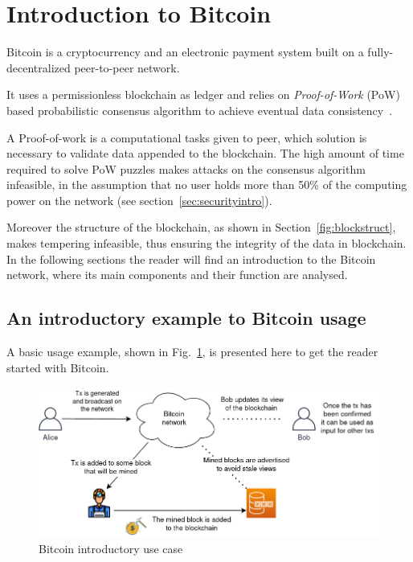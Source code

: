 \documentclass[12pt, letterpaper, twoside]{article}
\title{}
\author{}
\begin{document}
\maketitle

\section{Introduction to Bitcoin}\label{sec:introbtc}
Bitcoin is a cryptocurrency and an electronic payment system built on a fully-decentralized peer-to-peer network.

It uses a permissionless blockchain as ledger and relies on \emph{Proof-of-Work} (PoW) based probabilistic consensus algorithm to achieve eventual data consistency~\cite{nakamoto}.

A Proof-of-work is a computational tasks given to peer, which solution is necessary to validate data appended to the blockchain. The high amount of time required to solve PoW puzzles makes attacks on the consensus algorithm infeasible, in the assumption that no user holds more than 50\% of the computing power on the network (see section~\ref{sec:securityintro}).

Moreover the structure of the blockchain, as shown in Section~\ref{fig:blockstruct}, makes tempering infeasible, thus ensuring the integrity of the data in blockchain.\\

In the following sections the reader will find an introduction to the Bitcoin network, where its main components and their function are analysed.


\subsection{An introductory example to Bitcoin usage}\label{sec:useexample}
A basic usage example, shown in Fig.~\ref{fig:basicexample}, is presented here to get the reader started with Bitcoin.

\begin{figure}[h!]
	\includegraphics[width=.90\textwidth]{pict/basicexample.png}
	\centering
	\caption{Bitcoin introductory use case}
	\label{fig:basicexample}
\end{figure}
\end{document}
